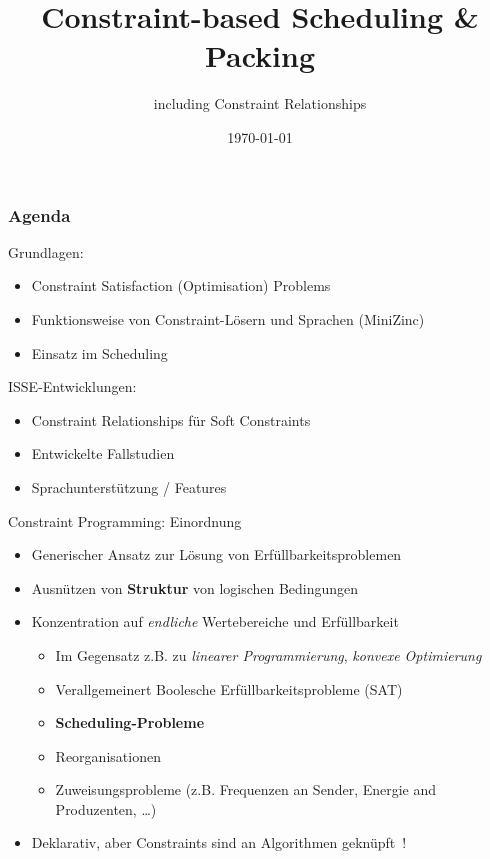 \documentclass[handout,10pt,xcolor={dvipsnames},fleqn]{beamer}
\title{Constraint-based Scheduling \& Packing}
\author{including Constraint Relationships}
\date{\today}
\begin{document}
\titleframe

\begin{frame}
    \frametitle{Agenda}
 \alert{Grundlagen:}
    \begin{itemize}
    \item Constraint Satisfaction (Optimisation) Problems
    \item Funktionsweise von Constraint-Lösern und Sprachen (MiniZinc)
    \item Einsatz im Scheduling
    \end{itemize}

    \vspace*{3ex}
    
\alert{ISSE-Entwicklungen:}
    \begin{itemize} 
    \item Constraint Relationships für Soft Constraints
    \item Entwickelte Fallstudien
    \item Sprachunterstützung / Features
     \end{itemize}
\end{frame}
\graphicspath{{img/}}

\begin{frame}{Constraint Programming: Einordnung}	
\begin{itemize}
\item Generischer Ansatz zur Lösung von \alert{Erfüllbarkeitsproblemen} 
\item Ausnützen von \textbf{Struktur} von logischen Bedingungen~\cite{tsang1993foundations}
\item Konzentration auf \emph{endliche} Wertebereiche und Erfüllbarkeit~\cite[Kap.~5]{russell2010artificial} \pause
\begin{itemize}
\item Im Gegensatz z.B. zu \emph{linearer Programmierung}, \emph{konvexe Optimierung}
\item Verallgemeinert Boolesche Erfüllbarkeitsprobleme (SAT)
\item \textbf{Scheduling-Probleme}
\item Reorganisationen
\item Zuweisungsprobleme (z.B. Frequenzen an Sender, Energie and Produzenten, \ldots)
\end{itemize} \pause
\item Deklarativ, aber Constraints sind an Algorithmen geknüpft~\cite{Rossi2006}! 
\end{itemize}
\end{frame}
\end{document}
